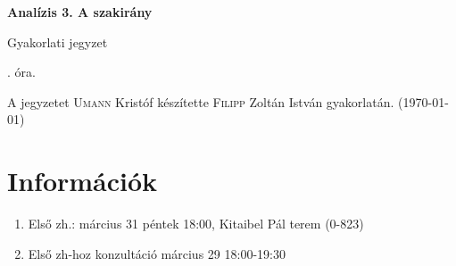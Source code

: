 \documentclass[a4paper,11.5pt]{article}
\begin{document}
	\setlength\parindent{0pt}
	\def\a{\textbf{a}}
	\def\b{\textbf{b}}
	\def\N{\hskip 10 true mm}
	\def\a{\textbf{a}}
	\def\b{\textbf{b}}
	\def\c{\textbf{c}}
	\def\d{\textbf{d}}
	\def\e{\textbf{e}}
	\def\gg{$\gamma$}
	\def\vi{\textbf{i}}
	\def\jj{\textbf{j}}
	\def\kk{\textbf{k}}
	\def\fh{\overrightarrow}
	\def\l{\lambda}
	\def\m{\mu}
	\def\v{\textbf{v}}
	\def\0{\textbf{0}}
	\def\s{\hspace{0.2mm}\vphantom{\beta}}
	\def\Z{\mathbb{Z}}
	\def\Q{\mathbb{Q}}
	\def\R{\mathbb{R}}
	\def\C{\mathbb{C}}
	\def\N{\mathbb{N}}
	\def\Rn{\mathbb{R}^{n}}
	\def\Ra{\overline{\mathbb{R}}}
	\def\sume{\displaystyle\sum_{n=1}^{+\infty}}
	\def\sumn{\displaystyle\sum_{n=0}^{+\infty}}
	\def\biz{\emph{Bizonyítás:\ }}
	\def\narrow{\underset{n\rightarrow+\infty}{\longrightarrow}}
	\def\limn{\displaystyle\lim_{n\to +\infty}}
	
	\theoremstyle{definition}
	\newtheorem{theorem}{Tétel}[subsection] %
	
	\theoremstyle{definition}
	\newtheorem{definition}[theorem]{Definíció} %
	\newtheorem{example}[theorem]{Példa} %
	\newtheorem{exercise}[theorem]{Házi feladat} %
	\newtheorem{note}[theorem]{Megjegyzés} %
	\newtheorem{task}[theorem]{Feladat} %
	\newtheorem{revision}[theorem]{Emlékeztető} %
	\begin{center}
		{\LARGE\textbf{Analízis 3. A szakirány}}
		\smallskip
		
		{\Large Gyakorlati jegyzet}
		
		. óra.
	\end{center}
	A jegyzetet \textsc{Umann} Kristóf készítette \textsc{Filipp} Zoltán István gyakorlatán. (\today)
	\section{Információk}
	\begin{enumerate}
		\item Első zh.: március 31 péntek 18:00, Kitaibel Pál terem (0-823)
		\item Első zh-hoz konzultáció március 29 18:00-19:30
	\end{enumerate}
\end{document}
